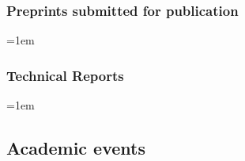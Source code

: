 \documentclass[10pt]{article}
\begin{document}
\subsubsection*{Preprints submitted for publication}

\sloppy
\emergencystretch=1em
\begin{enumerate}[label={[\arabic*]}]
	\item {}
	\item {}
	\item {}
	\item {}
	\item {}
	\item {}
	\item {}
	\item {}
	\item {}
	\item {}
	\item {}
	\item {}
\end{enumerate}

\subsubsection*{Technical Reports}

\sloppy
\emergencystretch=1em
\begin{enumerate}[label={[\arabic*]}]
	\item {}
\end{enumerate}

\subsection{Academic events}
\end{document}
